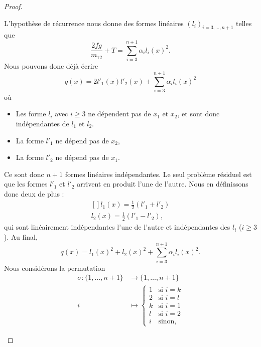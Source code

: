 \begin{proof}
\begin{subproof}
		L'hypothèse de récurrence nous donne des formes linéaires \( (l_i)_{i=3,\ldots, n+1}\) telles que
		\begin{equation}
			\frac{ 2fg }{ m_{12} }+T=\sum_{i=3}^{n+1}\alpha_il_i(x)^2.
		\end{equation}
		Nous pouvons donc déjà écrire
		\begin{equation}
			q(x)=2l'_1(x)l'_2(x)+\sum_{i=3}^{n+1}\alpha_il_i(x)^2
		\end{equation}
		où
		\begin{itemize}
			\item Les forme \( l_i\) avec \( i\geq 3\) ne dépendent pas de \( x_1\) et \( x_2\), et sont donc indépendantes de \( l_1\) et \( l_2\).
			\item La forme \( l'_1\) ne dépend pas de \( x_2\),
			\item La forme \( l'_2\) ne dépend pas de \( x_1\).
		\end{itemize}
		Ce sont donc \( n+1\) formes linéaires indépendantes. Le seul problème résiduel est que les formes \( l'_1\) et \( l'_2\) arrivent en produit l'une de l'autre. Nous en définissons donc deux de plus :
		\begin{equation}
			\begin{aligned}[]
				l_1(x)=\frac{ 1 }{2}(l'_1+l'_2) \\
				l_2(x)=\frac{ 1 }{2}(l'_1-l'_2),
			\end{aligned}
		\end{equation}
		qui sont linéairement indépendantes l'une de l'autre et indépendantes des \( l_i\) (\( i\geq 3\)). Au final,
		\begin{equation}
			q(x)=l_1(x)^2+l_2(x)^2+\sum_{i=3}^{n+1}\alpha_il_i(x)^2.
		\end{equation}
		\spitem[Si \( m_{ii}=0\) et \( m_{12}=0\) et \( m_{kl}\neq 0\) avec \( k<l\)]
		Nous considérons la permutation
		\begin{equation}
			\begin{aligned}
				\sigma\colon \{ 1,\ldots, n+1 \} & \to \{ 1,\ldots, n+1 \}             \\
				i                                & \mapsto \begin{cases}
					1 & \text{si } i=k \\
					2 & \text{si } i=l \\
					k & \text{si } i=1 \\
					l & \text{si } i=2 \\
					i & \text{sinon,}
				\end{cases}

\end{aligned}
\end{equation}
\end{subproof}
\end{proof}
